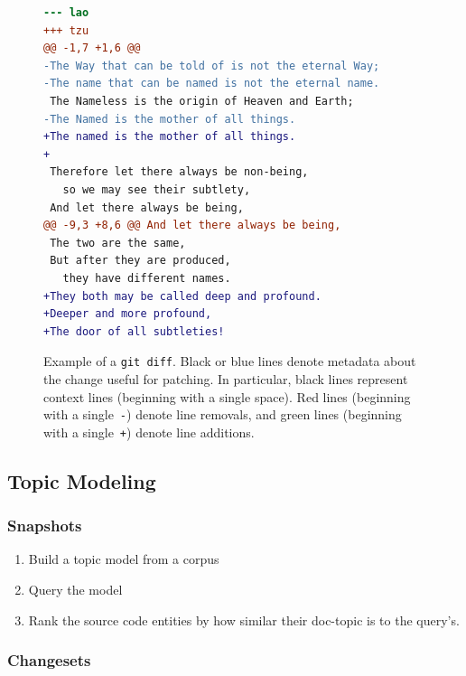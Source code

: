 \begin{figure}[ht]
\centering
\footnotesize
\begin{lstlisting}[language=diff, basicstyle=\ttfamily]
--- lao
+++ tzu
@@ -1,7 +1,6 @@
-The Way that can be told of is not the eternal Way;
-The name that can be named is not the eternal name.
 The Nameless is the origin of Heaven and Earth;
-The Named is the mother of all things.
+The named is the mother of all things.
+
 Therefore let there always be non-being,
   so we may see their subtlety,
 And let there always be being,
@@ -9,3 +8,6 @@ And let there always be being,
 The two are the same,
 But after they are produced,
   they have different names.
+They both may be called deep and profound.
+Deeper and more profound,
+The door of all subtleties!
\end{lstlisting}
\caption{Example of a \texttt{git diff}.
Black or blue lines denote metadata about the change useful for patching.
In particular, black lines represent context lines (beginning with
a single space).
Red lines (beginning with
a single~\texttt{-}) denote line removals, and green lines (beginning
with a single~\texttt{+}) denote line additions.}
\label{fig:diff}
\vspace{-10pt}
\end{figure}

\subsection{Topic Modeling}
\label{sec:topicmodeling}

\subsubsection{Snapshots}

\begin{enumerate}
    \item Build a topic model from a corpus
    \item Query the model
    \item Rank the source code entities by how similar their doc-topic is to the query's.
\end{enumerate}

\subsubsection{Changesets}

